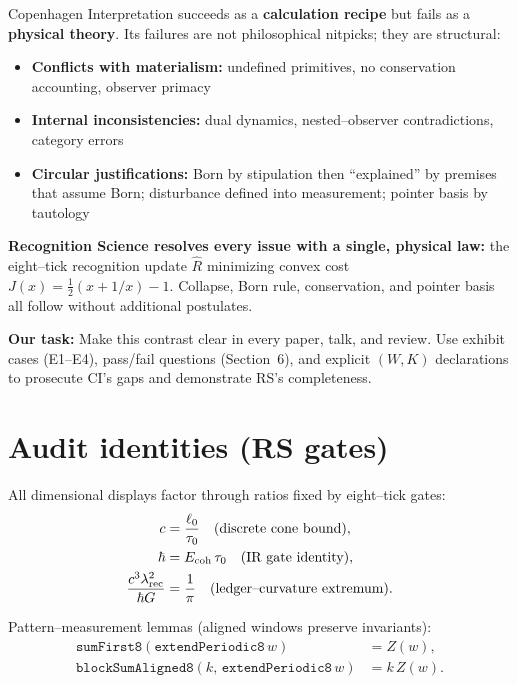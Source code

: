 \documentclass[11pt]{article}
\begin{document}
Copenhagen Interpretation succeeds as a \textbf{calculation recipe} but fails as a \textbf{physical theory}. Its failures are not philosophical nitpicks; they are structural:

\begin{itemize}[leftmargin=*]
  \item \textbf{Conflicts with materialism:} undefined primitives, no conservation accounting, observer primacy
  \item \textbf{Internal inconsistencies:} dual dynamics, nested--observer contradictions, category errors
  \item \textbf{Circular justifications:} Born by stipulation then ``explained'' by premises that assume Born; disturbance defined into measurement; pointer basis by tautology
\end{itemize}

\textbf{Recognition Science resolves every issue with a single, physical law:} the eight--tick recognition update $\hat R$ minimizing convex cost $J(x)=\tfrac12(x+1/x)-1$. Collapse, Born rule, conservation, and pointer basis all follow without additional postulates.

\textbf{Our task:} Make this contrast clear in every paper, talk, and review. Use exhibit cases (E1--E4), pass/fail questions (Section~6), and explicit $(W,K)$ declarations to prosecute CI's gaps and demonstrate RS's completeness.

\appendix

\section{Audit identities (RS gates)}

All dimensional displays factor through ratios fixed by eight--tick gates:
\begin{align*}
  c &= \frac{\ell_0}{\tau_0} \quad \text{(discrete cone bound)}, \\
  \hbar &= E_{\rm coh}\,\tau_0 \quad \text{(IR gate identity)}, \\
  \frac{c^3\lambda_{\rm rec}^2}{\hbar G} &= \frac{1}{\pi} \quad \text{(ledger--curvature extremum)}.
\end{align*}

Pattern--measurement lemmas (aligned windows preserve invariants):
\begin{align*}
  \texttt{sumFirst8}(\texttt{extendPeriodic8}\,w) &= Z(w), \\
  \texttt{blockSumAligned8}(k,\,\texttt{extendPeriodic8}\,w) &= k\,Z(w).
\end{align*}
\end{document}
